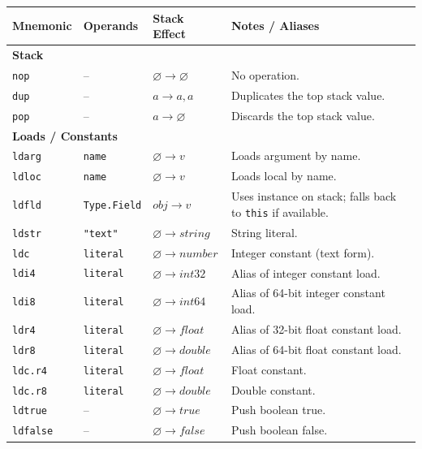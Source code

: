 \documentclass[11pt,a4paper]{article}
\begin{document}
	\begin{longtable}{|l|l|l|p{6.5cm}|}
		\hline
				\textbf{Mnemonic} & \textbf{Operands} & \textbf{Stack Effect} & \textbf{Notes / Aliases} \\
		\hline
		\endhead
		\multicolumn{4}{|l|}{\textbf{Stack}} \\
		\hline
				\texttt{nop} & -- & $\varnothing \rightarrow \varnothing$ & No operation. \\
				\texttt{dup} & -- & $a \rightarrow a, a$ & Duplicates the top stack value. \\
				\texttt{pop} & -- & $a \rightarrow \varnothing$ & Discards the top stack value. \\
		\hline
		\multicolumn{4}{|l|}{\textbf{Loads / Constants}} \\
		\hline
				\texttt{ldarg} & \texttt{name} & $\varnothing \rightarrow v$ & Loads argument by name. \\
				\texttt{ldloc} & \texttt{name} & $\varnothing \rightarrow v$ & Loads local by name. \\
				\texttt{ldfld} & \texttt{Type.Field} & $obj \rightarrow v$ & Uses instance on stack; falls back to \texttt{this} if available. \\
				\texttt{ldstr} & \texttt{"text"} & $\varnothing \rightarrow string$ & String literal. \\
				\texttt{ldc} & \texttt{literal} & $\varnothing \rightarrow number$ & Integer constant (text form). \\
				\texttt{ldi4} & \texttt{literal} & $\varnothing \rightarrow int32$ & Alias of integer constant load. \\
				\texttt{ldi8} & \texttt{literal} & $\varnothing \rightarrow int64$ & Alias of 64-bit integer constant load. \\
				\texttt{ldr4} & \texttt{literal} & $\varnothing \rightarrow float$ & Alias of 32-bit float constant load. \\
				\texttt{ldr8} & \texttt{literal} & $\varnothing \rightarrow double$ & Alias of 64-bit float constant load. \\
				\texttt{ldc.r4} & \texttt{literal} & $\varnothing \rightarrow float$ & Float constant. \\
				\texttt{ldc.r8} & \texttt{literal} & $\varnothing \rightarrow double$ & Double constant. \\
				\texttt{ldtrue} & -- & $\varnothing \rightarrow true$ & Push boolean true. \\
				\texttt{ldfalse} & -- & $\varnothing \rightarrow false$ & Push boolean false. \\

\end{longtable}
\end{document}
